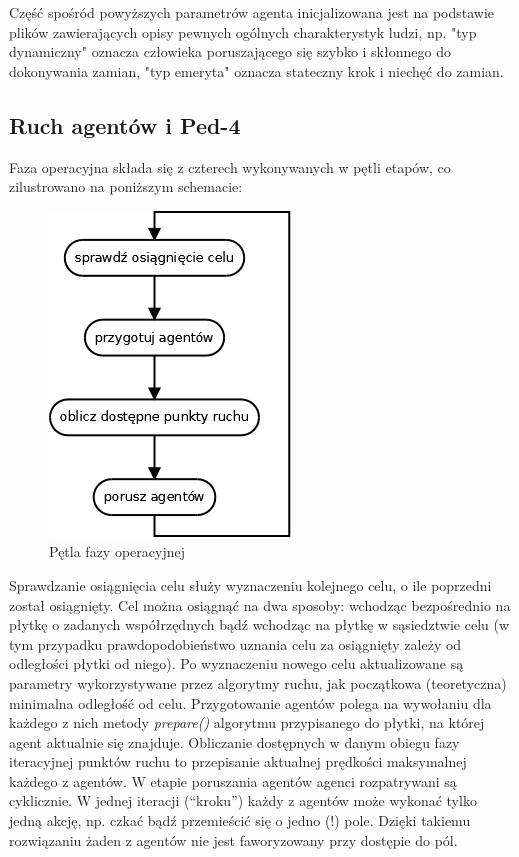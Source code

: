 \documentclass[a4paper, 12pt]{article}
\begin{document}
Część spośród powyższych parametrów agenta inicjalizowana jest na podstawie plików zawierających opisy pewnych ogólnych charakterystyk ludzi, np. "typ dynamiczny" oznacza człowieka poruszającego się szybko i skłonnego do dokonywania zamian, "typ emeryta" oznacza stateczny krok i niechęć do zamian.

        \subsection{Ruch agentów i Ped-4}
        \label{sec:movement-impl}

\noindent
Faza operacyjna składa się z czterech wykonywanych w pętli etapów, co zilustrowano na poniższym schemacie:

    \begin{figure}[H]
        \centering
        \includegraphics[scale=0.5]{./img/mainloop.png}
        \caption{Pętla fazy operacyjnej}
        \label{fig:operloop}
    \end{figure}

\indent Sprawdzanie osiągnięcia celu służy wyznaczeniu kolejnego celu, o ile poprzedni został osiągnięty. Cel można osiągnąć na dwa sposoby: wchodząc bezpośrednio na płytkę o zadanych współrzędnych bądź wchodząc na płytkę w sąsiedztwie celu (w tym przypadku prawdopodobieństwo uznania celu za osiągnięty zależy od odległości płytki od niego). Po wyznaczeniu nowego celu aktualizowane są parametry wykorzystywane przez algorytmy ruchu, jak początkowa (teoretyczna) minimalna odległość od celu. \newline
\indent Przygotowanie agentów polega na wywołaniu dla każdego z nich metody \emph{prepare()} algorytmu przypisanego do płytki, na której agent aktualnie się znajduje. \newline
\indent Obliczanie dostępnych w danym obiegu fazy iteracyjnej punktów ruchu to przepisanie aktualnej prędkości maksymalnej każdego z agentów. \newline
\indent W etapie poruszania agentów agenci rozpatrywani są cyklicznie. W jednej iteracji (``kroku'') każdy z agentów może wykonać tylko jedną akcję,  np. czkać bądź przemieścić się o jedno (!) pole. Dzięki takiemu rozwiązaniu żaden z agentów nie jest faworyzowany przy dostępie do pól.
\end{document}

